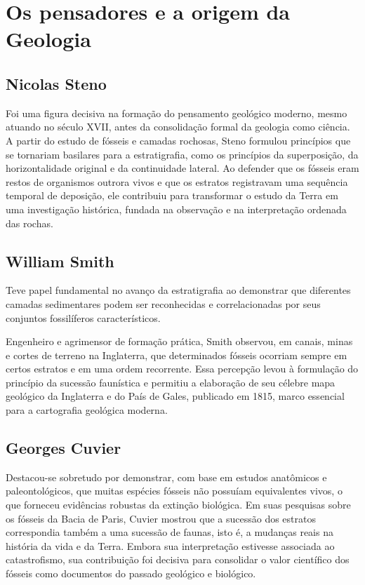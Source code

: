 \documentclass[a4paper,12pt]{article}
\theoremstyle{definition}
\theoremstyle{definition}
\theoremstyle{definition}
\begin{document}
\section{Os pensadores e a origem da Geologia}
\subsection{Nicolas Steno} Foi uma figura decisiva na formação do pensamento geológico moderno, mesmo atuando no século XVII, antes da consolidação formal da geologia como ciência. A partir do estudo de fósseis e camadas rochosas, Steno formulou princípios que se tornariam basilares para a estratigrafia, como os princípios da superposição, da horizontalidade original e da continuidade lateral. Ao defender que os fósseis eram restos de organismos outrora vivos e que os estratos registravam uma sequência temporal de deposição, ele contribuiu para transformar o estudo da Terra em uma investigação histórica, fundada na observação e na interpretação ordenada das rochas.

\subsection{William Smith}
Teve papel fundamental no avanço da estratigrafia ao demonstrar que diferentes camadas sedimentares podem ser reconhecidas e correlacionadas por seus conjuntos fossilíferos característicos. 

Engenheiro e agrimensor de formação prática, Smith observou, em canais, minas e cortes de terreno na Inglaterra, que determinados fósseis ocorriam sempre em certos estratos e em uma ordem recorrente. Essa percepção levou à formulação do princípio da sucessão faunística e permitiu a elaboração de seu célebre mapa geológico da Inglaterra e do País de Gales, publicado em 1815, marco essencial para a cartografia geológica moderna.

\subsection{Georges Cuvier} 
Destacou-se sobretudo por demonstrar, com base em estudos anatômicos e paleontológicos, que muitas espécies fósseis não possuíam equivalentes vivos, o que forneceu evidências robustas da extinção biológica. Em suas pesquisas sobre os fósseis da Bacia de Paris, Cuvier mostrou que a sucessão dos estratos correspondia também a uma sucessão de faunas, isto é, a mudanças reais na história da vida e da Terra. Embora sua interpretação estivesse associada ao catastrofismo, sua contribuição foi decisiva para consolidar o valor científico dos fósseis como documentos do passado geológico e biológico.
\end{document}
